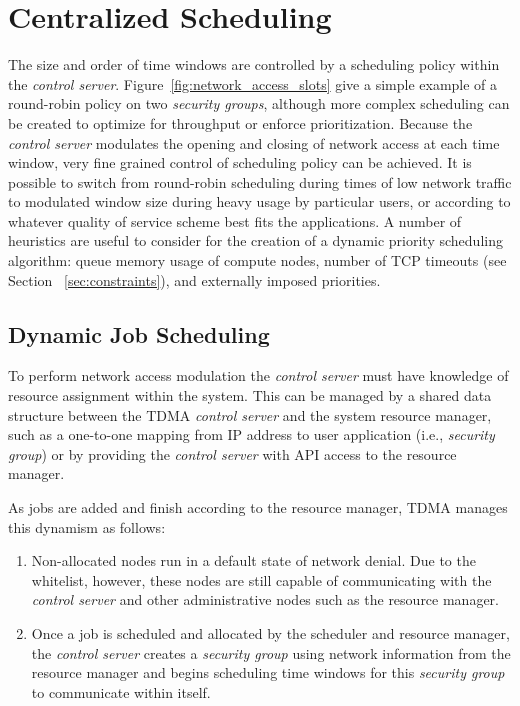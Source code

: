 \documentclass[oneside,12pt]{memoir}
\begin{document}
\section{Centralized Scheduling}
The size and order of time windows are controlled by a scheduling policy within the \textit{control server}. Figure~\ref{fig:network_access_slots} give a simple example of a round-robin policy on two \textit{security groups}, although more complex scheduling can be created to optimize for throughput or enforce prioritization. Because the \textit{control server} modulates the opening and closing of network access at each time window, very fine grained control of scheduling policy can be achieved. It is possible to switch from round-robin scheduling during times of low network traffic to modulated window size during heavy usage by particular users, or according to whatever quality of service scheme best fits the applications. A number of heuristics are useful to consider for the creation of a dynamic priority scheduling algorithm: queue memory usage of compute nodes, number of TCP timeouts (see Section ~\ref{sec:constraints}), and externally imposed priorities. 

\subsection{Dynamic Job Scheduling}
To perform network access modulation the \textit{control server} must have knowledge of resource assignment within the system. This can be managed by a shared data structure between the TDMA \textit{control server} and the system resource manager, such as a one-to-one mapping from IP address to user application (i.e., \textit{security group}) or by providing the \textit{control server} with API access to the resource manager.

As jobs are added and finish according to the resource manager, TDMA manages this dynamism as follows:
\begin{enumerate}
\item Non-allocated nodes run in a default state of network denial. Due to the whitelist, however, these nodes are still capable of communicating with the \textit{control server} and other administrative nodes such as the resource manager.
\item Once a job is scheduled and allocated by the scheduler and resource manager, the \textit{control server} creates a \textit{security group} using network information from the resource manager and begins scheduling time windows for this \textit{security group} to communicate within itself.
\end{enumerate}
\end{document}
